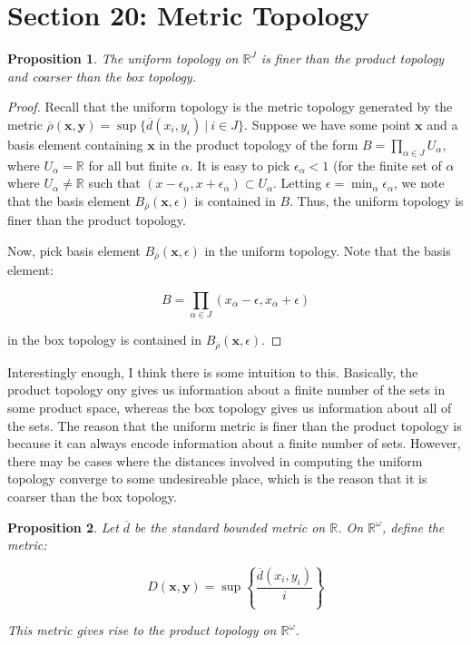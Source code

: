 \documentclass[10pt, oneside]{amsart}
\newtheorem{prop}{Proposition}
\newcommand{\bm}{\boldsymbol}
\begin{document}
    \section{Section 20: Metric Topology}

    \begin{prop}
      The uniform topology on $\mathbb{R}^{J}$ is finer than the product topology and coarser than the box topology.
    \end{prop}

    \begin{proof}
      Recall that the uniform topology is the metric topology generated by the metric $\overline{\rho}(\bm{x}, \bm{y}) = \sup \{ \overline{d}(x_i, y_i) \ | \ i \in J \}$. Suppose we have some point $\bm{x}$ and a
      basis element containing $\bm{x}$ in the product topology of the form $B = \prod_{\alpha \in J} U_{\alpha}$, where $U_{\alpha} = \mathbb{R}$ for all but finite $\alpha$. It is easy to pick $\epsilon_{\alpha} < 1$ (for the
      finite set of $\alpha$ where $U_{\alpha} \neq \mathbb{R}$ such that $(x - \epsilon_\alpha, x + \epsilon_\alpha) \subset U_{\alpha}$. Letting $\epsilon = \min_{\alpha} \epsilon_\alpha$, we note that the basis element
      $B_{\overline{\rho}}(\bm{x}, \epsilon)$ is contained in $B$. Thus, the uniform topology is finer than the product topology.
      \newline

      Now, pick basis element $B_{\overline{\rho}}(\bm{x}, \epsilon)$ in the uniform topology. Note that the basis element:

      $$B = \displaystyle\prod_{\alpha \in J} (x_\alpha - \epsilon, x_\alpha + \epsilon)$$

      in the box topology is contained in $B_{\overline{\rho}}(\bm{x}, \epsilon)$.
    \end{proof}

    Interestingly enough, I think there is some intuition to this. Basically, the product topology ony gives us information about a finite number of the sets in some product space, whereas the box topology gives us information about all of the
    sets. The reason that the uniform metric is finer than the product topology is because it can always encode information about a finite number of sets. However, there may be cases where the distances involved in computing the uniform topology converge
    to some undesireable place, which is the reason that it is coarser than the box topology.

    \begin{prop}
      Let $\overline{d}$ be the standard bounded metric on $\mathbb{R}$. On $\mathbb{R}^{\omega}$, define the metric:

      $$D(\bm{x}, \bm{y}) = \sup \left\{ \frac{ \overline{d}(x_i, y_i)}{i} \right\}$$

      This metric gives rise to the product topology on $\mathbb{R}^{\omega}$.
    \end{prop}
\end{document}
